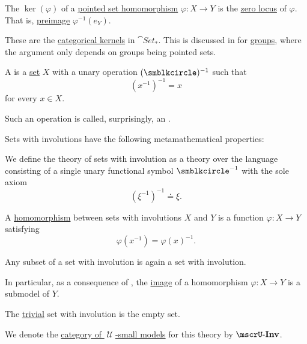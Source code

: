 \begin{definition}\label{def:pointed_set_kernel}\mimprovised
  The  \( \ker(\varphi) \) of a \hyperref[def:pointed_set/homomorphism]{pointed set homomorphism} \( \varphi: X \to Y \) is the \hyperref[def:zero_locus]{zero locus} of \( \varphi \). That is, \hyperref[thm:def:function/properties/preimage]{preimage} \( \varphi^{-1}(e_Y) \).

  These are the \hyperref[def:zero_morphisms/kernel]{categorical kernels} in \hyperref[def:pointed_set/category]{\( \cat{Set_*} \)}. This is discussed in  for \hyperref[def:group]{groups}, where the argument only depends on groups being pointed sets.
\end{definition}

\begin{definition}\label{def:set_with_involution}\mimprovised
  A  is a \hyperref[def:set]{set} \( X \) with a unary operation \( (\anon)^{-1} \) such that
  \begin{equation*}
    (x^{-1})^{-1} = x
  \end{equation*}
  for every \( x \in X \).

  Such an operation is called, surprisingly, an .

  Sets with involutions have the following metamathematical properties:
  \begin{thmenum}
     We define the theory of sets with involution as a theory over the language consisting of a single unary functional symbol \( \anon^{-1} \) with the sole axiom
    \begin{equation}\label{eq:def:set_with_involution/theory/axiom}
      (\xi^{-1})^{-1} \doteq \xi.
    \end{equation}

     A \hyperref[def:first_order_homomorphism]{homomorphism} between sets with involutions \( X \) and \( Y \) is a function \( \varphi: X \to Y \) satisfying
    \begin{equation}\label{eq:def:set_with_involution/homomorphism}
      \varphi(x^{-1})
      =
      \varphi(x)^{-1}.
    \end{equation}

     Any subset of a set with involution is again a set with involution.

    In particular, as a consequence of , the \hyperref[def:multi_valued_function/image]{image} of a homomorphism \( \varphi: X \to Y \) is a submodel of \( Y \).

     The \hyperref[thm:substructures_form_complete_lattice/bottom]{trivial} set with involution is the empty set.

     We denote the \hyperref[def:category_of_small_first_order_models]{category of \( \mscrU \)-small models} for this theory by \( \ucat{Inv} \).
  \end{thmenum}
\end{definition}

